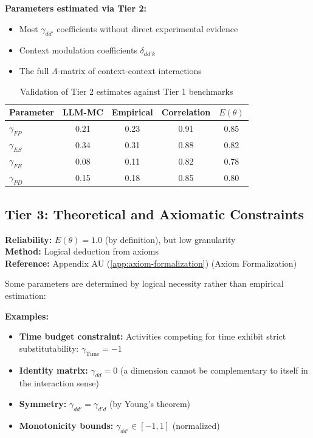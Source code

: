 \documentclass[11pt,a4paper]{article}
\theoremstyle{definition}
\begin{document}
\textbf{Parameters estimated via Tier 2:}
\begin{itemize}
    \item Most $\gamma_{dd'}$ coefficients without direct experimental evidence
    \item Context modulation coefficients $\delta_{dd'k}$
    \item The full $\Lambda$-matrix of context-context interactions
\end{itemize}

\begin{table}[h]
\centering
\small
\begin{tabular}{lcccc}
\toprule
\textbf{Parameter} & \textbf{LLM-MC} & \textbf{Empirical} & \textbf{Correlation} & $E(\theta)$ \\
\midrule
$\gamma_{FP}$ & 0.21 & 0.23 & 0.91 & 0.85 \\
$\gamma_{ES}$ & 0.34 & 0.31 & 0.88 & 0.82 \\
$\gamma_{FE}$ & 0.08 & 0.11 & 0.82 & 0.78 \\
$\gamma_{PD}$ & 0.15 & 0.18 & 0.85 & 0.80 \\
\bottomrule
\end{tabular}
\caption{Validation of Tier 2 estimates against Tier 1 benchmarks}
\label{tab:tier2-validation}
\end{table}

\subsection{Tier 3: Theoretical and Axiomatic Constraints}

\begin{tcolorbox}[colback=gray!5!white, colframe=gray!75!black]
\textbf{Reliability:} $E(\theta) = 1.0$ (by definition), but low granularity \\
\textbf{Method:} Logical deduction from axioms \\
\textbf{Reference:} Appendix AU (\ref{app:axiom-formalization}) (Axiom Formalization)
\end{tcolorbox}

Some parameters are determined by logical necessity rather than empirical 
estimation:

\textbf{Examples:}
\begin{itemize}
    \item \textbf{Time budget constraint:} Activities competing for time exhibit 
    strict substitutability: $\gamma_{\text{Time}} = -1$
    \item \textbf{Identity matrix:} $\gamma_{dd} = 0$ (a dimension cannot be 
    complementary to itself in the interaction sense)
    \item \textbf{Symmetry:} $\gamma_{dd'} = \gamma_{d'd}$ (by Young's theorem)
    \item \textbf{Monotonicity bounds:} $\gamma_{dd'} \in [-1, 1]$ (normalized)
\end{itemize}
\end{document}

